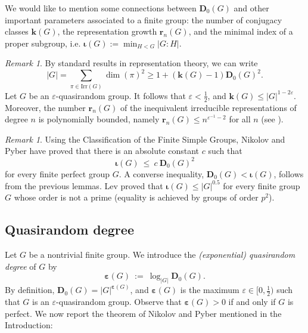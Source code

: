 \documentclass{daj}
\theoremstyle{definition}
\theoremstyle{remark}
\newtheorem{remark}[theorem]{Remark}
\newcommand{\Irr}{\mathrm{Irr}}
\newcommand{\kk}{\mathbf{k}}
\newcommand{\rr}{\mathbf{r}}
\newcommand{\D}{\mathbf{D}}
\renewcommand{\a}{\boldsymbol{\varepsilon}}
\newcommand{\iot}{\boldsymbol{\iota}}
\begin{document}
We would like to mention some connections between $\D_0(G)$ and other important parameters associated to a finite group:
the number of conjugacy classes $\kk(G)$, the representation growth $\rr_n(G)$,
and the minimal index of a proper subgroup, i.e. $\iot(G) := \min_{H<G} |G:H|$.

\begin{remark}
By standard results in representation theory, we can write
$$ |G| =  \sum_{\pi \in \Irr(G)} \dim(\pi)^2 \geq 1 + (\kk(G)-1) \D_0(G)^2 . $$
Let $G$ be an $\varepsilon$-quasirandom group.
It follows that $\varepsilon < \frac{1}{2}$, and $\kk(G) \leq |G|^{1-2\varepsilon}$.
Moreover, the number $\rr_n(G)$ of the inequivalent irreducible representations of degree $n$ is polynomially bounded,
namely $\rr_n(G) \leq n^{\varepsilon^{-1} -2}$ for all $n$ (see \cite[Lemma 25]{Sab23}).
\end{remark} 

\begin{remark} 
		Using the Classification of the Finite Simple Groups,
		Nikolov and Pyber \cite{NP11} have proved that there is an absolute constant $c$ such that
		$$ \iot(G) \> \leq \> c \> \D_0(G)^2 $$
		for every finite perfect group $G$.
		A converse inequality, $\D_0(G) < \iot(G)$, follows from the previous lemmas.
		Lev \cite{Lev92} proved that $\iot(G) \leq |G|^{0.5}$ for every finite group $G$ whose order is not a prime
		(equality is achieved by groups of order $p^2$).
	\end{remark}









\subsection{Quasirandom degree}

Let $G$ be a nontrivial finite group. We introduce the {\itshape (exponential) quasirandom degree} of $G$ by
$$ \a(G) \> := \> \log_{|G|} \D_0(G) . $$
By definition, $\D_0(G)=|G|^{\a(G)}$,
and $\a(G)$ is the maximum $\varepsilon \in [0,\frac{1}{2})$ such that $G$ is an $\varepsilon$-quasirandom group.
Observe that $\a(G) >0$ if and only if $G$ is perfect.
We now report the theorem of Nikolov and Pyber mentioned in the Introduction:
\end{document}
